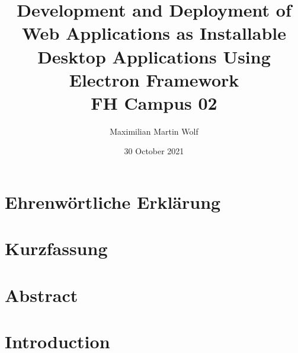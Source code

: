\documentclass[11pt]{article}
\title{
        {Development and Deployment of Web Applications as Installable Desktop Applications Using
    Electron Framework}\\
    {\large FH Campus 02}\\
}
\author{Maximilian Martin Wolf}
\date{30 October 2021}
\begin{document}
    \titleformat{\section}{\bfseries\sffamily\large\MakeUppercase}{\thesection}{0pt}{\quad}{}%


    \maketitle
    \clearpage

    \section*{Ehrenwörtliche Erklärung}\label{sec:ehrenwort}
    
    \clearpage
    \section*{Kurzfassung}\label{sec:kurzfassung}
    
    \clearpage
    \section*{Abstract}\label{sec:abstract}
    
    \clearpage

    \tableofcontents
    \clearpage

    \titleformat{\section}{\bfseries\sffamily\large\MakeUppercase}{\thesection}{0pt}{\hspace{9cm}}{}%

    \setcounter{page}{6}

    \section{Introduction}\label{sec:introduction}
    \setcounter{tocdepth}{3}
    
\end{document}
